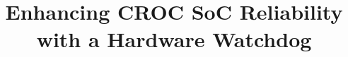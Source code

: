 \documentclass[%
 oneside,      %
 openany,      %
 halfparskip,  %
]{scrbook}
\title{Enhancing CROC SoC Reliability with a Hardware Watchdog} %
\begin{document}
\dominitoc

\frontmatter





\tableofcontents



\mainmatter






%



\appendix

\backmatter



\nocite*{} %
% 
% 
\end{document}
